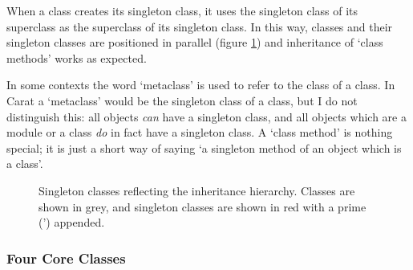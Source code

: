 When a class creates its singleton class, it uses the singleton class of its superclass as the superclass of its singleton class. In this way, classes and their singleton classes are positioned in parallel (figure \ref{fig:singleton_class_inheritance}) and inheritance of `class methods' works as expected.

In some contexts the word `metaclass' is used to refer to the class of a class. In Carat a `metaclass' would be the singleton class of a class, but I do not distinguish this: all objects \textit{can} have a singleton class, and all objects which are a module or a class \textit{do} in fact have a singleton class. A `class method' is nothing special; it is just a short way of saying `a singleton method of an object which is a class'.

\begin{figure}
\begin{center}
\caption{Singleton classes reflecting the inheritance hierarchy. Classes are shown in grey, and singleton classes are shown in red with a prime (') appended.}
\label{fig:singleton_class_inheritance}
\end{center}
\end{figure}

\subsubsection{Four Core Classes}

